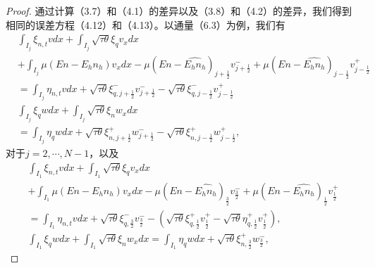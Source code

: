 \begin{proof}
    通过计算（3.7）和（4.1）的差异以及（3.8）和（4.2）的差异，我们得到相同的误差方程（4.12）和（4.13）。以通量（6.3）为例，我们有
    $$
        \begin{aligned}
             & \int_{I_{j}} \xi_{n, t} v d x+\int_{I_{j}} \sqrt{\tau \theta} \xi_{q} v_{x} d x                                                                                                                                         \\
             & +\int_{I_{j}} \mu\left(E n-E_{h} n_{h}\right) v_{x} d x-\mu\left(E n-\widehat{E_{h} n_{h}}\right)_{j+\frac{1}{2}} v_{j+\frac{1}{2}}^{-}+\mu\left(E n-\widehat{E_{h} n_{h}}\right)_{j-\frac{1}{2}} v_{j-\frac{1}{2}}^{+} \\
             & =\int_{I_{j}} \eta_{n, t} v d x+\sqrt{\tau \theta} \xi_{q, j+\frac{1}{2}}^{-} v_{j+\frac{1}{2}}^{-}-\sqrt{\tau \theta} \xi_{q, j-\frac{1}{2}}^{-} v_{j-\frac{1}{2}}^{+}                                                 \\
             & \int_{I_{j}} \xi_{q} w d x+\int_{I_{j}} \sqrt{\tau \theta} \xi_{n} w_{x} d x                                                                                                                                            \\
             & =\int_{I_{j}} \eta_{q} w d x+\sqrt{\tau \theta} \xi_{n, j+\frac{1}{2}}^{+} w_{j+\frac{1}{2}}^{-}-\sqrt{\tau \theta} \xi_{n, j-\frac{1}{2}}^{+} w_{j-\frac{1}{2}}^{+},
        \end{aligned}
    $$
    对于$j=2, \cdots, N-1$，以及
    \begin{gather*}
        \int_{I_{1}} \xi_{n, t} v d x+\int_{I_{1}} \sqrt{\tau \theta} \xi_{q} v_{x} d x                                                                                                                                                                  \\
        +\int_{I_{1}} \mu\left(E n-E_{h} n_{h}\right) v_{x} d x-\mu\left(E n-\widehat{E_{h} n_{h}}\right)_{\frac{3}{2}} v_{\frac{3}{2}}^{-}+\mu\left(E n-\widehat{E_{h} n_{h}}\right)_{\frac{1}{2}} v_{\frac{1}{2}}^{+}                                  \\
        =  \int_{I_{1}} \eta_{n, t} v d x+\sqrt{\tau \theta} \xi_{q, \frac{3}{2}}^{-} v_{\frac{3}{2}}^{-}-\left(\sqrt{\tau \theta} \xi_{q, \frac{1}{2}}^{+} v_{\frac{1}{2}}^{+}-\sqrt{\tau \theta} \eta_{q, \frac{1}{2}}^{+} v_{\frac{1}{2}}^{+}\right), \\
        \int_{I_{1}} \xi_{q} w d x+\int_{I_{1}} \sqrt{\tau \theta} \xi_{n} w_{x} d x=\int_{I_{1}} \eta_{q} w d x+\sqrt{\tau \theta} \xi_{n, \frac{3}{2}}^{+} w_{\frac{3}{2}}^{-},

\end{gather*}
\end{proof}
